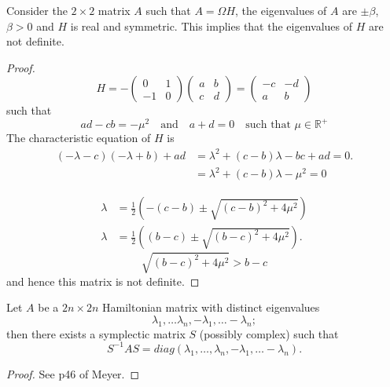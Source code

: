 \begin{lemma}
Consider the $2 \times 2$ matrix $A$ such that $A=\Omega H$, the eigenvalues of $A$ are $\pm \beta$, $\beta > 0$ and $H$ is real and symmetric. This implies that the eigenvalues of $H$ are not definite. \label{lem:hnotdefinite}
\end{lemma}
\begin{proof}
\begin{equation}
H = -\begin{pmatrix}0 & 1 \\ -1 & 0 \end{pmatrix} \begin{pmatrix} a & b \\ c & d \end{pmatrix} = \begin{pmatrix} -c & -d \\ a & b \end{pmatrix}
\end{equation}
such that 
\begin{equation}
ad - cb = -\mu^2 \quad \text{and} \quad a + d = 0 \quad \text{such that } \mu \in \mathbb{R}^+
\end{equation} 
The characteristic equation of $H$ is
\begin{equation}
\begin{aligned}
(-\lambda - c)(-\lambda + b) + ad &= \lambda^2 + (c - b)\lambda - bc + ad = 0. \\
& = \lambda^2 + (c-b)\lambda - \mu^2 = 0
\end{aligned}
\end{equation}

\begin{equation}
\begin{aligned}
\lambda &= \frac{1}{2}(-(c-b) \pm \sqrt{(c-b)^2 + 4\mu^2}) \\
\lambda &= \frac{1}{2}((b-c) \pm \sqrt{(b-c)^2 + 4\mu^2}).
\end{aligned}
\end{equation}
\begin{equation}
\sqrt{(b-c)^2 + 4\mu^2} > b-c
\end{equation}
and hence this matrix is not definite.
\end{proof}

\begin{lemma}Let $A$ be a $2n \times 2n$ Hamiltonian matrix with distinct eigenvalues 
\begin{equation} \lambda_1, \ldots \lambda_n, -\lambda_1, \ldots  -\lambda_n; \end{equation} then there exists a symplectic matrix $S$ (possibly complex) such that 
\begin{equation}
S^{-1}AS = diag(\lambda_1, \ldots, \lambda_n,-\lambda_1, \ldots -\lambda_n).
\end{equation}
\label{lem:2n2n}
\end{lemma} 
\begin{proof}
See p46 of Meyer.
\end{proof}

